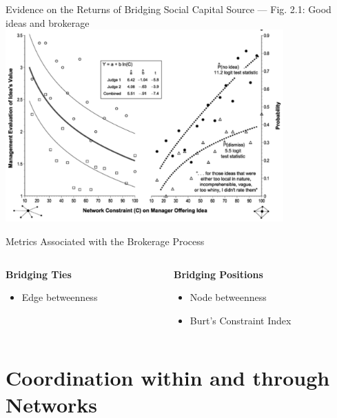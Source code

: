 \documentclass[aspectratio=1610]{beamer}
\begin{document}
\begin{frame}{Evidence on the Returns of Bridging Social Capital}
	{Source \cite{burt2007} --- Fig. 2.1: Good ideas and brokerage}
	\centering
	\includegraphics[width=0.8\textwidth]{images/good_ideas.png}
\end{frame}


\begin{frame}{Metrics Associated with the Brokerage Process}
	\begin{columns}[t]
		\begin{column}{0.5\textwidth}
			\textbf{Bridging Ties}
			\begin{itemize}
				\item Edge betweenness
			\end{itemize}
		\end{column}
		\begin{column}{0.5\textwidth}
			\textbf{Bridging Positions}
			\begin{itemize}
				\item Node betweenness
				\item Burt's Constraint Index
			\end{itemize}
		\end{column}
	\end{columns}
\end{frame}

\section{Coordination within and through Networks}
\end{document}
